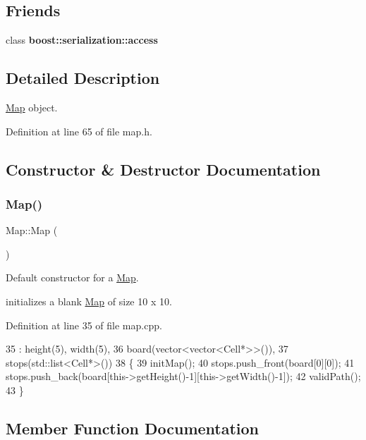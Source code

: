 \subsection*{Friends}
\begin{DoxyCompactItemize}
\item 
\hypertarget{class_map_ac98d07dd8f7b70e16ccb9a01abf56b9c}{}\label{class_map_ac98d07dd8f7b70e16ccb9a01abf56b9c} 
class {\bfseries boost\+::serialization\+::access}
\end{DoxyCompactItemize}


\subsection{Detailed Description}
\hyperlink{class_map}{Map} object. 

Definition at line 65 of file map.\+h.



\subsection{Constructor \& Destructor Documentation}
\hypertarget{class_map_a0f5ad0fd4563497b4214038cbca8b582}{}\label{class_map_a0f5ad0fd4563497b4214038cbca8b582} 
\subsubsection{\texorpdfstring{Map()}{Map()}}
{\footnotesize\ttfamily Map\+::\+Map (\begin{DoxyParamCaption}{ }\end{DoxyParamCaption})}



Default constructor for a \hyperlink{class_map}{Map}. 

initializes a blank \hyperlink{class_map}{Map} of size 10 x 10. 

Definition at line 35 of file map.\+cpp.


\begin{DoxyCode}
35          : height(5), width(5),
36 board(vector<vector<Cell*>>()),
37 stops(std::list<Cell*>())
38 \{
39     initMap();
40     stops.push\_front(board[0][0]);
41     stops.push\_back(board[this->getHeight()-1][this->getWidth()-1]);
42     validPath();
43 \}
\end{DoxyCode}


\subsection{Member Function Documentation}
\hypertarget{class_map_a7e89d11a89a796ac46e60722533f23d4}{}\label{class_map_a7e89d11a89a796ac46e60722533f23d4} 
